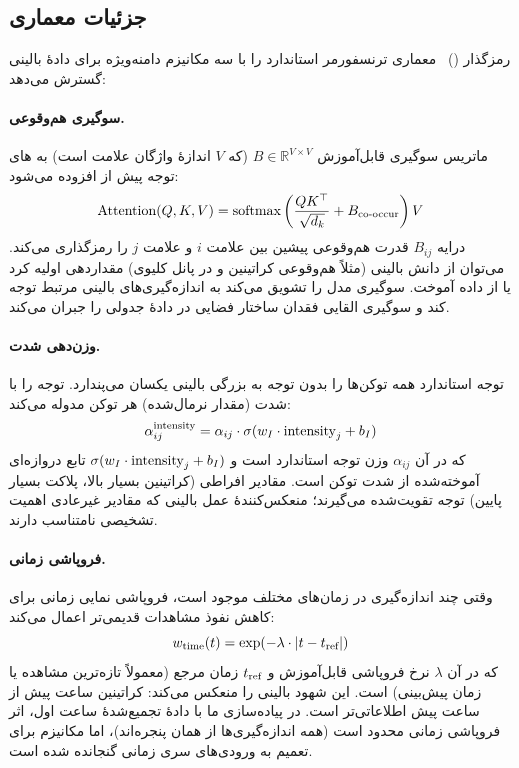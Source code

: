 \subsection{جزئیات معماری }

رمزگذار  ()~\cite{sharafi2023ethos} معماری ترنسفورمر استاندارد را با سه مکانیزم دامنه‌ویژه برای دادۀ بالینی گسترش می‌دهد:

\paragraph{سوگیری هم‌وقوعی.} ماتریس سوگیری قابل‌آموزش $B \in \mathbb{R}^{V \times V}$ (که $V$ اندازۀ واژگان علامت است) به های توجه پیش از  افزوده می‌شود:
\begin{equation}
\text{Attention}(Q, K, V) = \text{softmax}\left(\frac{QK^\top}{\sqrt{d_k}} + B_{\text{co-occur}}\right) V
\end{equation}
درایه $B_{ij}$ قدرت هم‌وقوعی پیشین بین علامت $i$ و علامت $j$ را رمزگذاری می‌کند. می‌توان از دانش بالینی (مثلاً هم‌وقوعی کراتینین و  در پانل کلیوی) مقداردهی اولیه کرد یا از داده آموخت. سوگیری مدل را تشویق می‌کند به اندازه‌گیری‌های بالینی مرتبط توجه کند و سوگیری القایی فقدان ساختار فضایی در دادۀ جدولی را جبران می‌کند.

\paragraph{وزن‌دهی شدت.} توجه استاندارد همه توکن‌ها را بدون توجه به بزرگی بالینی یکسان می‌پندارد.  توجه را با شدت (مقدار نرمال‌شده) هر توکن مدوله می‌کند:
\begin{equation}
\alpha_{ij}^{\text{intensity}} = \alpha_{ij} \cdot \sigma(w_I \cdot \text{intensity}_j + b_I)
\end{equation}
که در آن $\alpha_{ij}$ وزن توجه استاندارد است و $\sigma(w_I \cdot \text{intensity}_j + b_I)$ تابع دروازه‌ای آموخته‌شده از شدت توکن است. مقادیر افراطی (کراتینین بسیار بالا، پلاکت بسیار پایین) توجه تقویت‌شده می‌گیرند؛ منعکس‌کنندۀ عمل بالینی که مقادیر غیرعادی اهمیت تشخیصی نامتناسب دارند.

\paragraph{فروپاشی زمانی.} وقتی چند اندازه‌گیری در زمان‌های مختلف موجود است،  فروپاشی نمایی زمانی برای کاهش نفوذ مشاهدات قدیمی‌تر اعمال می‌کند:
\begin{equation}
w_{\text{time}}(t) = \exp(-\lambda \cdot |t - t_{\text{ref}}|)
\end{equation}
که در آن $\lambda$ نرخ فروپاشی قابل‌آموزش و $t_{\text{ref}}$ زمان مرجع (معمولاً تازه‌ترین مشاهده یا زمان پیش‌بینی) است. این شهود بالینی را منعکس می‌کند: کراتینین  ساعت پیش از  ساعت پیش اطلاعاتی‌تر است. در پیاده‌سازی ما با دادۀ تجمیع‌شدۀ  ساعت اول، اثر فروپاشی زمانی محدود است (همه اندازه‌گیری‌ها از همان پنجره‌اند)، اما مکانیزم برای تعمیم به ورودی‌های سری زمانی گنجانده شده است.

